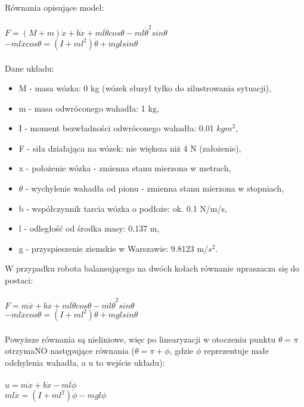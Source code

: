\documentclass[a4paper,12pt,twoside,openany]{report}
\begin{document}
\noindent Równania opisujące model:\\
\\
$F=(M+m)\ddot{x}+b\dot{x}+ml\ddot{\theta}cos\theta-ml\dot{\theta}^2sin\theta$ \\
$-ml\ddot{x}cos\theta=(I+ml^2)\ddot{\theta}+mglsin\theta$ \\
\\
Dane układu:
\begin{itemize}
\item M - masa wózka: 0 kg (wózek słuzył tylko do zilustrowania sytuacji),
\item m - masa odwróconego wahadła: 1 kg,
\item I - moment bezwładności odwróconego wahadła: 0.01 $kgm^2$,
\item F - siła działająca na wózek: nie większa niż 4 N (założenie),
\item x - położenie wózka - zmienna stanu mierzona w metrach,
\item $\theta$ - wychylenie wahadła od pionu - zmienna stanu mierzona w stopniach,
\item b - współczynnik tarcia wózka o podłoże: ok. 0.1 N/m/s, 
\item l - odległość od środka masy: 0.137 m,
\item g - przyspieszenie ziemskie w Warszawie: 9.8123 m/$s^2$.
\end{itemize} 

\noindent W przypadku robota balansującego na dwóch kołach równanie upraszacza się do postaci:\\
\\
$F=m\ddot{x}+b\dot{x}+ml\ddot{\theta}cos\theta-ml\dot{\theta}^2sin\theta$ \\
$-ml\ddot{x}cos\theta=(I+ml^2)\ddot{\theta}+mglsin\theta$ \\
\\
Powyższe równania są nieliniowe, więc po linearyzacji w otoczeniu punktu $\theta=\pi$ otrzymaNO następujące równania ($\theta=\pi+\phi$, gdzie $\phi$ reprezentuje małe odchylenia wahadła, a u to wejście układu):\\
\\
$u=m\ddot{x}+b\dot{x}-ml\ddot{\phi}$ \\
$ml\ddot{x}=(I+ml^2)\ddot{\phi}-mgl\phi$ \\
\end{document}
